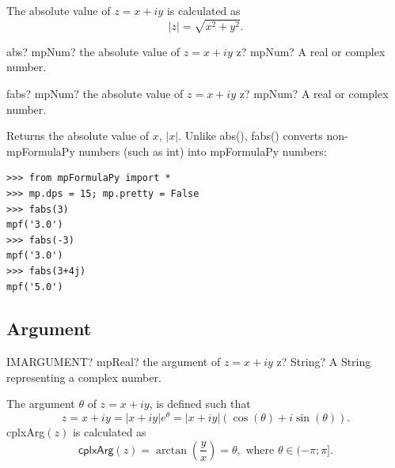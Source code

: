 \vspace{0.3cm}
The absolute value of $z=x+iy$ is calculated as
\begin{equation}
|z|=\sqrt{x^2+y^2}.
\end{equation}

\vspace{0.6cm}

\begin{mpFunctionsExtract}
	\mpFunctionOne
	{abs? mpNum? the absolute value of $z=x+iy$}
	{z? mpNum? A real or complex number.}
\end{mpFunctionsExtract}



\vspace{0.6cm}

\begin{mpFunctionsExtract}
	\mpFunctionOne
	{fabs? mpNum? the absolute value of $z=x+iy$}
	{z? mpNum? A real or complex number.}
\end{mpFunctionsExtract}


\vpara
Returns the absolute value of $x$, $|x|$. Unlike abs(), fabs() converts non-mpFormulaPy numbers (such as int) into mpFormulaPy numbers:

\begin{lstlisting}
>>> from mpFormulaPy import *
>>> mp.dps = 15; mp.pretty = False
>>> fabs(3)
mpf('3.0')
>>> fabs(-3)
mpf('3.0')
>>> fabs(3+4j)
mpf('5.0')
\end{lstlisting}

\subsection{Argument}

\begin{mpFunctionsExtract}
	\mpWorksheetFunctionOneNotImplemented
	{IMARGUMENT? mpReal? the argument of $z=x+iy$}
	{z? String? A String representing a complex number.}
\end{mpFunctionsExtract}

\vspace{0.3cm}
The argument $\theta$ of $z=x+iy$, is defined such that
\begin{equation}
z=x+iy = |x+iy|e^{\theta} = |x+iy|(\cos(\theta)+ i \sin(\theta)).
\end{equation}
\textsf{cplxArg$(z)$} is calculated as
\begin{equation}
\textsf{cplxArg$(z)$}  = \arctan\left(\frac{y}{x} \right) = \theta, \text{ where } \theta \in (-\pi;\pi].
\end{equation}

